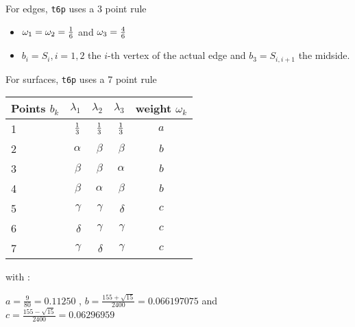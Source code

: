 For edges,  {\tt t6p} uses a 3 point rule

  \begin{itemize} 
    \item $\omega_1 = \omega_2 = {1 \over 6}$ and $\omega_3 = {4 \over 6}$
    \item $b_i=S_i, i=1,2$  the  $i$-th vertex of the actual edge and
          $b_3 = S_{i,i+1}$ the midside.
   \end{itemize}


For surfaces, {\tt t6p} uses a 7 point rule 
 \begin {center}
 \begin{large}
 \begin{tabular}{|l|r|r|r|c|}
  \hline
Points $b_k$ & $\lambda_1$   & $\lambda_2$   & $\lambda_3$  & weight $\omega_k$ \\
\hline                                             
1           & ${ 1 \over 3 }$ & ${ 1 \over 3 }$ & ${1 \over 3 }$ & $a$         \\
\hline  
2           & $\alpha$      & $\beta$         & $\beta$        & $b$ \\
\hline                                           
3           & $\beta$       & $\beta$         & $\alpha$       & $b$ \\
\hline                                           
4           & $\beta$       & $\alpha$        & $\beta$        & $b$ \\
\hline                                           
5           & $\gamma$      & $\gamma$        & $\delta$       & $c$ \\
\hline                                           
6           & $\delta$      & $\gamma$        & $\gamma$       & $c$ \\
\hline                                           
7           & $\gamma$      & $\delta$        & $\gamma$       & $c$ \\
\hline                                           
\end{tabular} 
\end{large}
\end{center}
with : \par
      \begin{large}
       $ a = \frac{ 9 }{ 80} = 0.11250 $ ,  
       $ b = \frac {155 + \sqrt{15}} {2400 } = 0.066197075 $ and \\
       $ c = \frac {155 - \sqrt{15}} {2400 } = 0.06296959 $
      \end{large}

